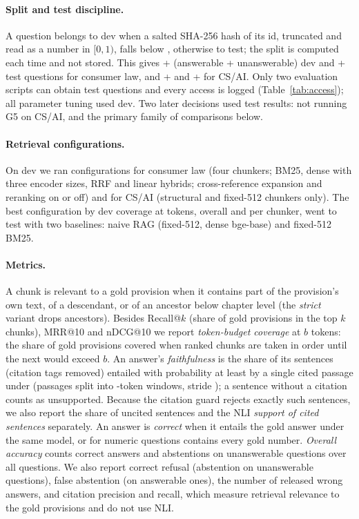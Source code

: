 \paragraph{Split and test discipline.}
A question belongs to dev when a salted SHA-256 hash of its id, truncated and read as a number in $[0,1)$, falls below , otherwise to test; the split is computed each time and not stored.
This gives + (answerable + unanswerable) dev and + test questions for consumer law, and + and + for CS/AI.
Only two evaluation scripts can obtain test questions and every access is logged (Table~\ref{tab:access}); all parameter tuning used dev. Two later decisions used test results: not running G5 on CS/AI, and the primary family of comparisons below.

\paragraph{Retrieval configurations.}
On dev we ran  configurations for consumer law (four chunkers; BM25, dense with three encoder sizes, RRF and linear hybrids; cross-reference expansion and reranking on or off) and  for CS/AI (structural and fixed-512 chunkers only).
The best configuration by dev coverage at  tokens, overall and per chunker, went to test with two baselines: naive RAG (fixed-512, dense bge-base) and fixed-512 BM25.

\paragraph{Metrics.}
A chunk is relevant to a gold provision when it contains part of the provision's own text, of a descendant, or of an ancestor below chapter level (the \emph{strict} variant drops ancestors).
Besides Recall@$k$ (share of gold provisions in the top $k$ chunks), MRR@10 and nDCG@10 we report \emph{token-budget coverage} at $b$ tokens: the share of gold provisions covered when ranked chunks are taken in order until the next would exceed $b$.
An answer's \emph{faithfulness} is the share of its sentences (citation tags removed) entailed with probability at least  by a single cited passage under  (passages split into -token windows, stride ); a sentence without a citation counts as unsupported. Because the citation guard rejects exactly such sentences, we also report the share of uncited sentences and the NLI \emph{support of cited sentences} separately.
An answer is \emph{correct} when it entails the gold answer under the same model, or for numeric questions contains every gold number.
\emph{Overall accuracy} counts correct answers and abstentions on unanswerable questions over all questions. We also report correct refusal (abstention on unanswerable questions), false abstention (on answerable ones), the number of released wrong answers, and citation precision and recall, which measure retrieval relevance to the gold provisions and do not use NLI.

